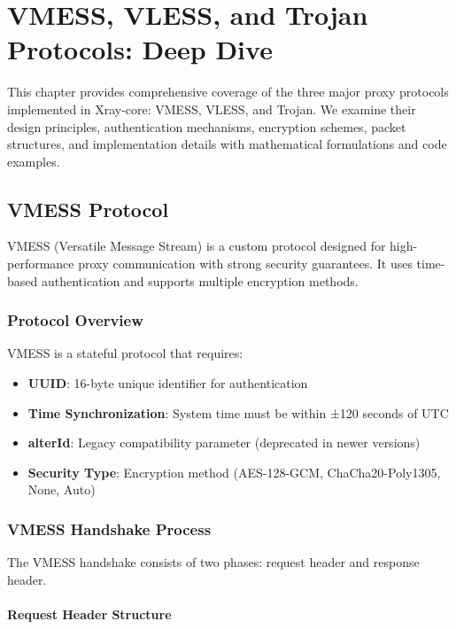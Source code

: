 \chapter{VMESS, VLESS, and Trojan Protocols: Deep Dive}

This chapter provides comprehensive coverage of the three major proxy protocols implemented in Xray-core: VMESS, VLESS, and Trojan. We examine their design principles, authentication mechanisms, encryption schemes, packet structures, and implementation details with mathematical formulations and code examples.

\section{VMESS Protocol}

VMESS (Versatile Message Stream) is a custom protocol designed for high-performance proxy communication with strong security guarantees. It uses time-based authentication and supports multiple encryption methods.

\subsection{Protocol Overview}

VMESS is a stateful protocol that requires:
\begin{itemize}
    \item \textbf{UUID}: 16-byte unique identifier for authentication
    \item \textbf{Time Synchronization}: System time must be within ±120 seconds of UTC
    \item \textbf{alterId}: Legacy compatibility parameter (deprecated in newer versions)
    \item \textbf{Security Type}: Encryption method (AES-128-GCM, ChaCha20-Poly1305, None, Auto)
\end{itemize}

\subsection{VMESS Handshake Process}

The VMESS handshake consists of two phases: request header and response header.

\subsubsection{Request Header Structure}

